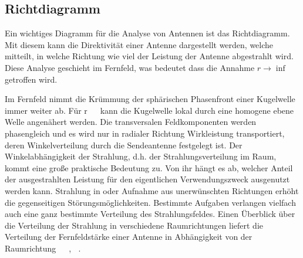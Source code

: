 \subsection{Richtdiagramm}

Ein wichtiges Diagramm für die Analyse von Antennen ist das Richtdiagramm. Mit diesem kann die Direktivität einer Antenne dargestellt werden, welche mitteilt, in welche Richtung wie viel der Leistung der Antenne abgestrahlt wird. Diese Analyse geschieht im Fernfeld, was bedeutet dass die Annahme $r \rightarrow \inf$ getroffen wird.

Im Fernfeld nimmt die Krümmung der sphärischen Phasenfront einer Kugelwelle immer weiter
ab. Für r   kann die Kugelwelle lokal durch eine homogene ebene Welle angenähert werden. Die transversalen Feldkomponenten werden phasengleich und es wird nur in radialer Richtung Wirkleistung transportiert, deren Winkelverteilung durch die Sendeantenne festgelegt ist.
Der Winkelabhängigkeit der Strahlung, d.h. der Strahlungsverteilung im Raum, kommt eine
große praktische Bedeutung zu. Von ihr hängt es ab, welcher Anteil der ausgestrahlten Leistung
für den eigentlichen Verwendungszweck ausgenutzt werden kann. Strahlung in oder Aufnahme
aus unerwünschten Richtungen erhöht die gegenseitigen Störungsmöglichkeiten. Bestimmte
Aufgaben verlangen vielfach auch eine ganz bestimmte Verteilung des Strahlungsfeldes. Einen
Überblick über die Verteilung der Strahlung in verschiedene Raumrichtungen liefert die Verteilung der Fernfeldstärke einer Antenne in Abhängigkeit von der Raumrichtung   , . 
